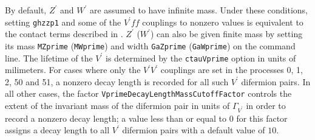 \documentclass[aps,superscriptaddress,nofootinbib]{revtex4}
\begin{document}
By default, $Z^\prime$ and $W^\prime$ are assumed to have infinite mass. Under these conditions, setting \verb|ghzzp1| and  some of the $V^\prime ff$ couplings to nonzero values is equivalent to the contact terms described in \cite{Gonzalez-Alonso:2014eva}.  $Z^\prime$ ($W^\prime$) can also be given finite mass by setting its mass \verb|MZprime| (\verb|MWprime|) and width \verb|GaZprime| (\verb|GaWprime|) on the command line. The lifetime of the $V^\prime$ is determined by the \verb|ctauVprime| option in units of milimeters. For cases where only the $V^\prime V^\prime$ couplings are set in the processes 0, 1, 2, 50 and 51, a nonzero decay length is recorded for all such $V^\prime$ difermion pairs. In all other cases, the factor \verb|VprimeDecayLengthMassCutoffFactor| controls the extent of the invariant mass of the difermion pair in units of $\Gamma_{V^\prime}$ in order to record a nonzero decay length; a value less than or equal to $0$ for this factor assigns a decay length to all $V^\prime$ difermion pairs with a default value of $10$.\\
\end{document}

